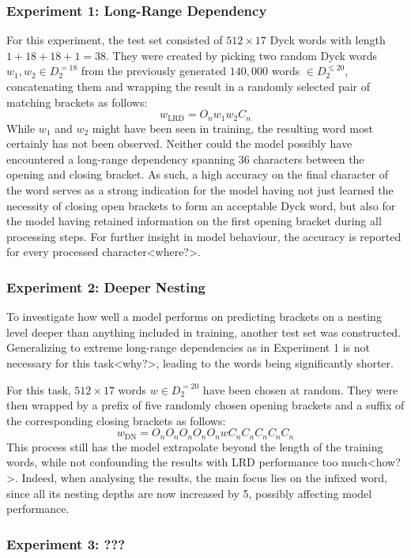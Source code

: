 \subsubsection{Experiment 1: Long-Range Dependency}\label{LRD}
For this experiment, the test set consisted of $512 \times 17$ Dyck words with length $1+18+18+1=38$. They were created by picking two random Dyck words $w_{1}, w_{2} \in D_{2}^{=18}$ from the previously generated $140,000$ words $\in D_{2}^{\leq 20}$, concatenating them and wrapping the result in a randomly selected pair of matching brackets as follows:
\[
	w_{\text{LRD}} = O_{n}w_{1}w_{2}C_{n}
\]
While $w_{1}$ and $w_{2}$ might have been seen in training, the resulting word most certainly has not been observed. Neither could the model possibly have encountered a long-range dependency spanning $36$ characters between the opening and closing bracket. As such, a high accuracy on the final character of the word serves as a strong indication for the model having not just learned the necessity of closing open brackets to form an acceptable Dyck word, but also for the model having retained information on the first opening bracket during all processing steps. For further insight in model behaviour, the accuracy is reported for every processed character<where?>.

\subsubsection{Experiment 2: Deeper Nesting}\label{DN}
To investigate how well a model performs on predicting brackets on a nesting level deeper than anything included in training, another test set was constructed. Generalizing to extreme long-range dependencies as in Experiment 1 is not necessary for this task<why?>, leading to the words being significantly shorter.

For this task, $512 \times 17$ words $w \in D_{2}^{=20}$ have been chosen at random. They were then wrapped by a prefix of five randomly chosen opening brackets and a suffix of the corresponding closing brackets as follows:
\[
	w_{\text{DN}} = O_{n}O_{n}O_{n}O_{n}O_{n}wC_{n}C_{n}C_{n}C_{n}C_{n}
\]
This process still has the model extrapolate beyond the length of the training words, while not confounding the results with LRD performance too much<how?>. Indeed, when analysing the results, the main focus lies on the infixed word, since all its nesting depths are now increased by 5, possibly affecting model performance.

\subsubsection{Experiment 3: ???}